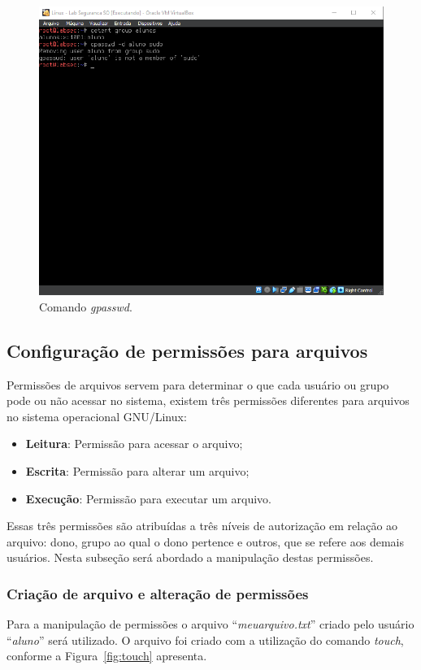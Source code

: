 \documentclass[
  12pt,				%
  oneside,   	        %
  a4paper,			%
  english,			%
  french,				%
  spanish,			%
  brazil,				%
  ]{pacotes/abntex2}
\begin{document}
\begin{figure}[H]
  \centering
  \includegraphics[scale=0.7]{figuras/gpasswd.png}
  \caption{Comando \textit{gpasswd}.}
  \label{fig:gpasswd}
\end{figure}

\subsection{Configuração de permissões para arquivos}
Permissões de arquivos servem para determinar o que cada usuário ou grupo pode ou não acessar no sistema, existem três permissões diferentes para arquivos no sistema operacional GNU/Linux:

\begin{itemize}
    \item \textbf{Leitura}: Permissão para acessar o arquivo;
    \item \textbf{Escrita}: Permissão para alterar um arquivo;
    \item \textbf{Execução}: Permissão para executar um arquivo.
\end{itemize}

Essas três permissões são atribuídas a três níveis de autorização em relação ao arquivo: dono, grupo ao qual o dono pertence e outros, que se refere aos demais usuários. Nesta subseção será abordado a manipulação destas permissões.

\subsubsection{Criação de arquivo e alteração de permissões}
Para a manipulação de permissões o arquivo ``\textit{meuarquivo.txt}'' criado pelo usuário ``\textit{aluno}'' será utilizado. O arquivo foi criado com a utilização do comando \textit{touch}, conforme a Figura~\ref{fig:touch} apresenta.
\end{document}
